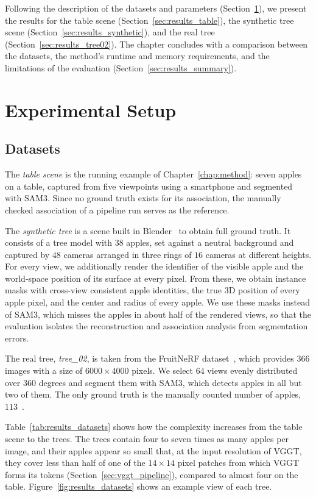 \documentclass[english, egger, bsc]{vcethesis}
\begin{document}
Following the description of the datasets and parameters (Section~\ref{sec:results_setup}), we present the results for the table scene (Section~\ref{sec:results_table}), the synthetic tree scene (Section~\ref{sec:results_synthetic}), and the real tree (Section~\ref{sec:results_tree02}). The chapter concludes with a comparison between the datasets, the method's runtime and memory requirements, and the limitations of the evaluation (Section~\ref{sec:results_summary}).

\section{Experimental Setup}
\label{sec:results_setup}
\subsection{Datasets}
\label{sec:results_datasets}
The \emph{table scene} is the running example of Chapter~\ref{chap:method}: seven apples on a table, captured from five viewpoints using a smartphone and segmented with SAM3. Since no ground truth exists for its association, the manually checked association of a pipeline run serves as the reference.

The \emph{synthetic tree} is a scene built in Blender~\cite{blender} to obtain full ground truth. It consists of a tree model with $38$ apples, set against a neutral background and captured by $48$ cameras arranged in three rings of $16$ cameras at different heights. For every view, we additionally render the identifier of the visible apple and the world-space position of its surface at every pixel. From these, we obtain instance masks with cross-view consistent apple identities, the true 3D position of every apple pixel, and the center and radius of every apple. We use these masks instead of SAM3, which misses the apples in about half of the rendered views, so that the evaluation isolates the reconstruction and association analysis from segmentation errors.

The real tree, \emph{tree\_02}, is taken from the FruitNeRF dataset~\cite{meyer2024fruitnerf}, which provides $366$ images with a size of $6000 \times 4000$ pixels. We select $64$ views evenly distributed over $360$ degrees and segment them with SAM3, which detects apples in all but two of them. The only ground truth is the manually counted number of apples, $113$~\cite{meyer2024fruitnerf}.

Table~\ref{tab:results_datasets} shows how the complexity increases from the table scene to the trees. The trees contain four to seven times as many apples per image, and their apples appear so small that, at the input resolution of VGGT, they cover less than half of one of the $14 \times 14$ pixel patches from which VGGT forms its tokens (Section~\ref{sec:vggt_pipeline}), compared to almost four on the table. Figure~\ref{fig:results_datasets} shows an example view of each tree.
\end{document}

